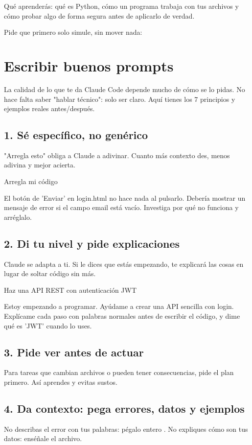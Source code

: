 \documentclass[11pt,a4paper]{book}
\begin{document}
Qué aprenderás: qué es Python, cómo un programa trabaja con tus archivos y cómo probar algo de forma segura antes de aplicarlo de verdad.

Pide que primero solo simule, sin mover nada:

\chapter{Escribir buenos prompts}
La calidad de lo que te da Claude Code depende mucho de cómo se lo pidas. No hace falta saber "hablar técnico": solo ser claro. Aquí tienes los 7 principios y ejemplos reales antes/después.

\section{1. Sé específico, no genérico}
"Arregla esto" obliga a Claude a adivinar. Cuanto más contexto des, menos adivina y mejor acierta.

Arregla mi código

El botón de 'Enviar' en login.html no hace nada al pulsarlo. Debería mostrar un mensaje de error si el campo email está vacío. Investiga por qué no funciona y arréglalo.

\section{2. Di tu nivel y pide explicaciones}
Claude se adapta a ti. Si le dices que estás empezando, te explicará las cosas en lugar de soltar código sin más.

Haz una API REST con autenticación JWT

Estoy empezando a programar. Ayúdame a crear una API sencilla con login. Explícame cada paso con palabras normales antes de escribir el código, y dime qué es 'JWT' cuando lo uses.

\section{3. Pide ver antes de actuar}
Para tareas que cambian archivos o pueden tener consecuencias, pide el plan primero. Así aprendes y evitas sustos.

\section{4. Da contexto: pega errores, datos y ejemplos}
No describas el error con tus palabras: pégalo entero . No expliques cómo son tus datos: enséñale el archivo.
\end{document}

